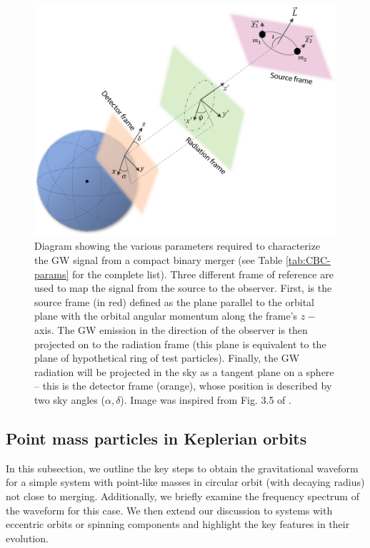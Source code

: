 \begin{figure}
    \centering
    \includegraphics[width=\textwidth]{figures/Introduction/gw-ref-frame.png}
    \caption{Diagram showing the various parameters required to characterize the GW signal from a compact binary merger (see Table \ref{tab:CBC-params} for the complete list). Three different frame of reference are used to map the signal from the source to the observer. First, is the source frame (in red) defined as the plane parallel to the orbital plane with the orbital angular momentum along the frame's $z-$axis. The GW emission in the direction of the observer is then projected on to the radiation frame (this plane is equivalent to the plane of hypothetical ring of test particles). Finally, the GW radiation will be projected in the sky as a tangent plane on a sphere -- this is the detector frame (orange), whose position is described by two sky angles ($\alpha, \delta$). Image was inspired from Fig. 3.5 of \cite{Schafer:2023pbm}.}
    \label{fig:gw-ref-frame}
\end{figure}

\subsection{Point mass particles in Keplerian orbits}\label{sec:circular-binary-PN}  
In this subsection, we outline the key steps to obtain the gravitational waveform for a simple system with point-like masses in circular orbit (with decaying radius) not close to merging. Additionally, we briefly examine the frequency spectrum of the waveform for this case. We then extend our discussion to systems with eccentric orbits or spinning components and highlight the key features in their evolution.

